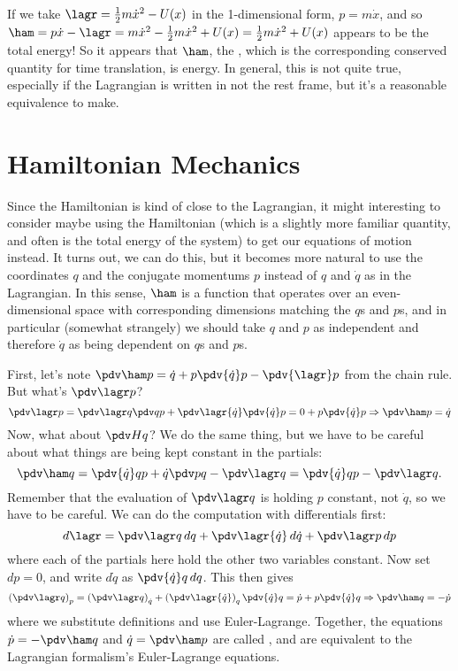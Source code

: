\documentclass[12pt]{article}
\begin{document}
If we take $\lagr = \frac{1}{2}m \dot x^2 - U(x)$ in the 1-dimensional form, $p
= m \dot x$, and so $\ham = p \dot x - \lagr = m \dot x^2 - \frac{1}{2} m \dot x^2 +
U(x) = \frac{1}{2} m \dot x^2 + U(x)$ appears to be the total energy! So it
appears that $\ham$, the , which is the corresponding conserved
quantity for time translation, is energy. In general, this is not quite true,
especially if the Lagrangian is written in not the rest frame, but it's a
reasonable equivalence to make.  

\section{Hamiltonian Mechanics}
Since the Hamiltonian is kind of close to the Lagrangian, it might interesting
to consider maybe using the Hamiltonian (which is a slightly more familiar
quantity, and often is the total energy of the system) to get our equations of
motion instead. It turns out, we can do this, but it becomes more natural to use
the coordinates $q$ and the conjugate momentums $p$ instead of $q$ and $\dot q$
as in the Lagrangian. In this sense, $\ham$ is a function that operates over an
even-dimensional space with corresponding dimensions matching the $q$s and $p$s,
and in particular (somewhat strangely) we should take $q$ and $p$ as independent
and therefore $\dot q$ as being dependent on $q$s and $p$s. 

First, let's note $\pdv \ham p = \dot q + p \pdv {\dot q} p - \pdv{\lagr} p$ from the
chain rule. But what's $\pdv \lagr p$? 
\[
 \pdv \lagr p = \pdv \lagr q \pdv q p + \pdv \lagr {\dot q} \pdv{\dot q} p = 0 +
 p \pdv {\dot q} p \Rightarrow \pdv \ham p = \dot q
\]
Now, what about $\pdv H q$? We do the same thing, but we have to be careful
about what things are being kept constant in the partials: \[
  \pdv \ham q = \pdv{\dot q} q p + \dot q \pdv p q - \pdv \lagr q = \pdv{\dot q}
  q  p - \pdv \lagr q.
\] 
Remember that the evaluation of $\pdv \lagr q$ is holding $p$ constant, not
$\dot q$, so we have to be careful. We can do the computation with differentials
first:  
\[
  d \lagr = \pdv \lagr q \, dq + \pdv \lagr {\dot q} \, d \dot q + \pdv \lagr p
  \, dp
\] 
where each of the partials here hold the other two variables constant. 
Now set $dp = 0$, and write $d \dot q$ as $\pdv{\dot q} q \, dq$. This then
gives \[ \left(\pdv \lagr q\right)_p = \left(\pdv \lagr q\right)_{\dot q} + \left(
\pdv \lagr {\dot q} \right)_q \pdv{\dot q}q = \dot p + p \pdv{\dot q}q
\Rightarrow \pdv \ham q = - \dot p 
\] where we substitute definitions and use Euler-Lagrange. Together, the
equations $\dot p = - \pdv \ham q$ and $\dot q = \pdv \ham p$ are called
, and are equivalent to the Lagrangian formalism's
Euler-Lagrange equations. 
\end{document}
